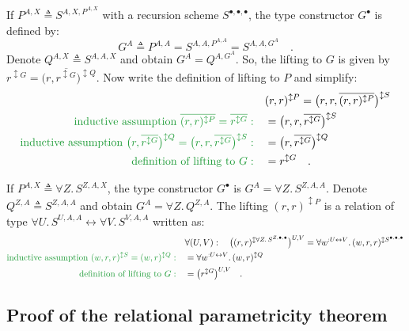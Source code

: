 If $P^{A,X}\triangleq S^{A,X,P^{A,X}}$ with a recursion scheme $S^{\bullet,\bullet,\bullet}$,
the type constructor $G^{\bullet}$ is defined by: 
\[
G^{A}\triangleq P^{A,A}=S^{A,A,P^{A,A}}=S^{A,A,G^{A}}\quad.
\]
Denote $Q^{A,X}\triangleq S^{A,A,X}$ and obtain $G^{A}=Q^{A,G^{A}}$.
So, the lifting to $G$ is given by $r^{\updownarrow G}=\big(r,\overline{r^{\updownarrow G}}\big)^{\updownarrow Q}$.
Now write the definition of lifting to $P$ and simplify:
\begin{align*}
 & (r,r)^{\updownarrow P}=\big(r,r,\overline{(r,r)^{\updownarrow P}}\big)^{\updownarrow S}\\
{\color{greenunder}\text{inductive assumption }\overline{(r,r)^{\updownarrow P}}=\overline{r^{\updownarrow G}}:}\quad & =\big(r,r,\overline{r^{\updownarrow G}}\big)^{\updownarrow S}\\
{\color{greenunder}\text{inductive assumption }\big(r,\overline{r^{\updownarrow G}}\big)^{\updownarrow Q}=\big(r,r,\overline{r^{\updownarrow G}}\big)^{\updownarrow S}:}\quad & =\big(r,\overline{r^{\updownarrow G}}\big)^{\updownarrow Q}\\
{\color{greenunder}\text{definition of lifting to }G:}\quad & =r^{\updownarrow G}\quad.
\end{align*}

If $P^{A,X}\triangleq\forall Z.\,S^{Z,A,X}$, the type constructor
$G^{\bullet}$ is $G^{A}=\forall Z.\,S^{Z,A,A}$. Denote $Q^{Z,A}\triangleq S^{Z,A,A}$
and obtain $G^{A}=\forall Z.\,Q^{Z,A}$. The lifting $(r,r)^{\updownarrow P}$
is a relation of type $\forall U.\,S^{U,A,A}\leftrightarrow\forall V.\,S^{V,A,A}$
written as:
\begin{align*}
 & \forall(U,V):\quad\big((r,r)^{\updownarrow\forall Z.\,S^{Z,\bullet,\bullet}}\big)^{U,V}=\forall w^{:U\leftrightarrow V}.\,(w,r,r)^{\updownarrow S^{\bullet,\bullet,\bullet}}\\
{\color{greenunder}\text{inductive assumption }(w,r,r)^{\updownarrow S}=(w,r)^{\updownarrow Q}:}\quad & =\forall w^{:U\leftrightarrow V}.\,(w,r)^{\updownarrow Q}\\
{\color{greenunder}\text{definition of lifting to }G:}\quad & =\big(r^{\updownarrow G}\big)^{U,V}\quad.
\end{align*}


\subsection{Proof of the relational parametricity theorem\label{subsec:Relational-parametricity-theorem}}


